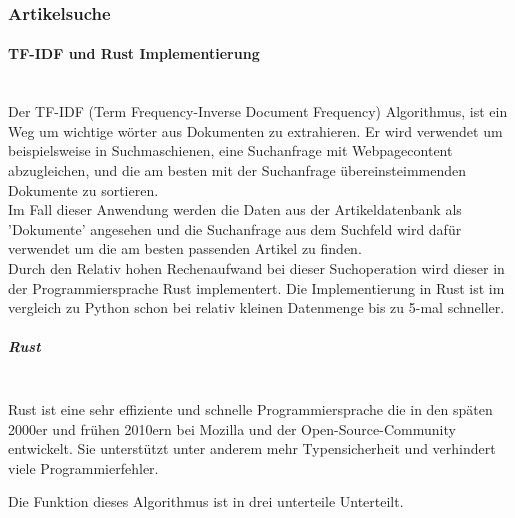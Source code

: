 \subsubsection{Artikelsuche}
\paragraph{TF-IDF und Rust Implementierung} \hspace{0pt} \\
Der TF-IDF (Term Frequency-Inverse Document Frequency) Algorithmus, ist ein Weg um wichtige wörter aus Dokumenten zu extrahieren. Er wird verwendet um beispielsweise in Suchmaschienen, eine Suchanfrage mit Webpagecontent abzugleichen, und die am besten mit der Suchanfrage übereinsteimmenden Dokumente zu sortieren. \\
Im Fall dieser Anwendung werden die Daten aus der Artikeldatenbank als 'Dokumente'  angesehen und die Suchanfrage aus dem Suchfeld wird dafür verwendet um die am besten passenden Artikel zu finden.
\\
Durch den Relativ hohen Rechenaufwand bei dieser Suchoperation wird dieser in der Programmiersprache Rust implementert. Die Implementierung in Rust ist im vergleich zu Python schon bei relativ kleinen Datenmenge bis zu 5-mal schneller.

\subparagraph{Rust}\mbox{}\\
Rust ist eine sehr effiziente und schnelle Programmiersprache die in den späten 2000er und frühen 2010ern bei Mozilla und der Open-Source-Community entwickelt. Sie unterstützt unter anderem mehr Typensicherheit und verhindert viele Programmierfehler.\cite{chatgpt}

Die Funktion dieses Algorithmus ist in drei unterteile Unterteilt.

